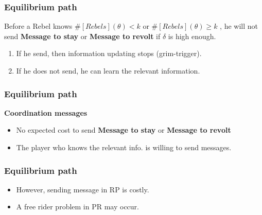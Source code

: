 \documentclass[10pt]{beamer}
\begin{document}
\begin{frame}
\frametitle{Equilibrium path}






\begin{lemma}
Before a Rebel knows $\#[Rebels](\theta)< k$ or $\#[Rebels](\theta)\geq k$ , he will not send \textbf{Message to stay} or \textbf{Message to revolt} if $\delta$ is high enough.
\end{lemma}
\begin{enumerate}
\item If he send, then information updating stops (grim-trigger).
\item If he does not send, he can learn the relevant information.

\end{enumerate}




\end{frame}


\begin{frame}
\frametitle{Equilibrium path}

\textbf{Coordination messages}

\begin{itemize}
\item \alert{No expected cost} to send \textbf{Message to stay}  or \textbf{Message to revolt} 
\item The player who knows the relevant info. is willing to send messages.

\end{itemize}

\end{frame}

\begin{frame}
\frametitle{Equilibrium path}


\begin{itemize}
\item However, sending message in RP is costly. 
\item A free rider problem in PR may occur.
\end{itemize}

\end{frame}
\end{document}
